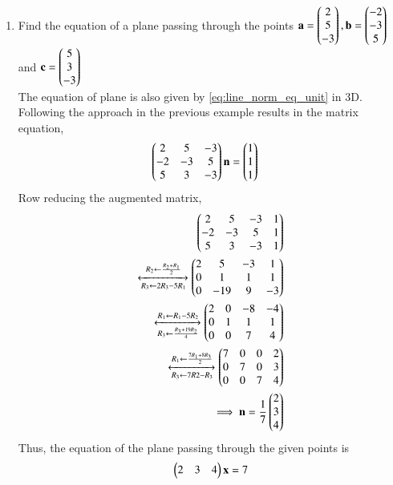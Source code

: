 \renewcommand{\theequation}{\theenumi}
\begin{enumerate}[label=\thesection.\arabic*.,ref=\thesection.\theenumi]

\item  Find the equation of a plane passing through the points $\mathbf{a}=\begin{pmatrix}2\\5\\-3\end{pmatrix}, \mathbf{b}=\begin{pmatrix}-2\\-3\\5\end{pmatrix}$ and $\mathbf{c}=\begin{pmatrix}5\\3\\-3\end{pmatrix}$ 
\label{eq:plane}
\\
\solution
The equation of  plane is also  given by \eqref{eq:line_norm_eq_unit} in 3D.  Following the approach in the previous example results in the matrix equation, 
\begin{align}
\begin{pmatrix}2&5&-3 \\ -2&-3&5 \\ 5&3&-3\end{pmatrix} \mathbf{n} &= \begin{pmatrix}1\\1\\1\end{pmatrix}
\end{align}
Row reducing the augmented matrix, 
\begin{align}
\begin{pmatrix}2&5&-3 & 1\\ -2&-3&5 & 1\\ 5&3&-3 & 1\end{pmatrix} 
\\
\xleftrightarrow[R_3\leftarrow 2R_3-5R_1]{R_2\leftarrow \frac{R_2+R_1}{2} }\begin{pmatrix}2&5&-3 & 1\\ 0&1&1 & 1\\ 0&-19&9 & -3\end{pmatrix} 
\\
\xleftrightarrow[R_3\leftarrow \frac{R_3+19R_2}{4}]{R_1\leftarrow R_1-5R_2 }\begin{pmatrix}2&0&-8 & -4\\ 0&1&1 & 1\\ 0&0&7 & 4\end{pmatrix}\\ 
\xleftrightarrow[R_3\leftarrow 7R2-R_3]{R_1\leftarrow \frac{7R_1+8R_3}{2} }\begin{pmatrix}7&0&0 & 2\\ 0&7&0 & 3\\ 0&0&7 & 4\end{pmatrix} 
\\
\implies \mathbf{n} = \frac{1}{7}\begin{pmatrix}2\\3\\4\end{pmatrix}
\end{align}
Thus, the equation of the plane passing through the given points is
%
\begin{align}
\begin{pmatrix}2 & 3 & 4\end{pmatrix}\mathbf{x} = 7
\end{align} 

\end{enumerate}
